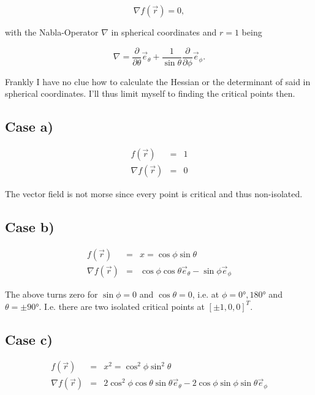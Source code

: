 \documentclass[a4paper,10pt,notitlepage]{scrartcl}
\begin{document}
\begin{equation}
 \nabla f(\vec{r}) = 0,
\end{equation}


with the Nabla-Operator $\nabla$ in spherical coordinates and $r = 1$ being

\begin{equation}
 \nabla = \frac{\partial}{\partial \theta} \vec{e}_\theta + \frac{1}{\sin
\theta} \frac{\partial}{\partial \phi} \vec{e}_\phi.
\end{equation}

Frankly I have no clue how to calculate the Hessian or the determinant
of said in spherical coordinates. I'll thus limit myself to finding the critical
points then.

\subsection{Case a)}

\begin{eqnarray}
 f(\vec{r}) &=& 1 \\
 \nabla f(\vec{r}) &=& 0
\end{eqnarray}

The vector field is not morse since every point is critical and thus
non-isolated.

\subsection{Case b)}

\begin{eqnarray}
 f(\vec{r}) &=& x = \cos\phi \sin\theta \\
 \nabla f(\vec{r}) &=& \cos\phi \cos\theta \vec{e}_\theta - \sin\phi
\vec{e}_\phi
\end{eqnarray}

The above turns zero for $\sin\phi = 0$ and $\cos\theta = 0$, i.e. at $\phi =
0°, 180°$ and $\theta = \pm 90°$. I.e. there are two isolated critical points at
$[\pm 1, 0, 0]^T$.

\subsection{Case c)}

\begin{eqnarray}
 f(\vec{r}) &=& x^2 = \cos^2 \phi \sin^2 \theta \\
 \nabla f(\vec{r}) &=& 2 \cos^2 \phi \cos\theta \sin\theta \vec{e}_\theta -
2 \cos\phi \sin\phi \sin\theta \vec{e}_\phi
\end{eqnarray}
\end{document}
